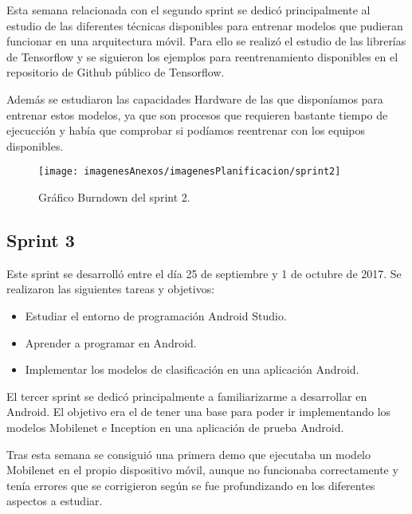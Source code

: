 Esta semana relacionada con el segundo sprint se dedicó principalmente al estudio de las diferentes técnicas disponibles para entrenar modelos que pudieran funcionar en una arquitectura móvil. Para ello se realizó el estudio de las librerías de Tensorflow y se siguieron los ejemplos para reentrenamiento disponibles en el repositorio de Github público de Tensorflow. 

Además se estudiaron las capacidades Hardware de las que disponíamos para entrenar estos modelos, ya que son procesos que requieren bastante tiempo de ejecucción y había que comprobar si podíamos reentrenar con los equipos disponibles.

\begin{figure}[h]
    \begin{center}%
        \begin{center}%
          \texttt{[image: imagenesAnexos/imagenesPlanificacion/sprint2]}%
          \caption{Gráfico Burndown del sprint 2.}%
          \label{figSprint2}%
        \end{center}%
  	\end{center}%
\end{figure}%

\subsection{Sprint 3}

Este sprint se desarrolló entre el día 25 de septiembre y 1 de octubre de 2017. Se realizaron las siguientes tareas y objetivos:

\begin{itemize}
	\item Estudiar el entorno de programación Android Studio.
	\item Aprender a programar en Android.
	\item Implementar los modelos de clasificación en una aplicación Android.
\end{itemize}

El tercer sprint se dedicó principalmente a familiarizarme a desarrollar en Android. El objetivo era el de tener una base para poder ir implementando los modelos Mobilenet e Inception en una aplicación de prueba Android.

Tras esta semana se consiguió una primera demo que ejecutaba un modelo Mobilenet en el propio dispositivo móvil, aunque no funcionaba correctamente y tenía errores que se corrigieron según se fue profundizando en los diferentes aspectos a estudiar.

